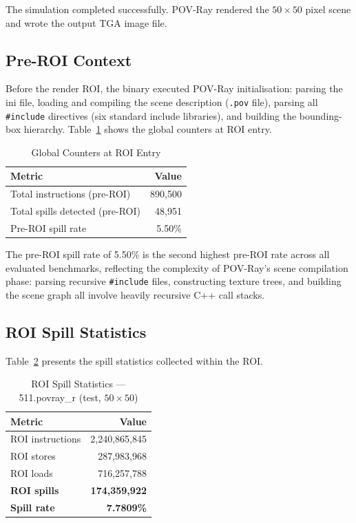 \documentclass[conference]{IEEEtran}
\begin{document}
The simulation completed successfully. POV-Ray rendered the
$50\times50$ pixel scene and wrote the output TGA image file.

\subsection{Pre-ROI Context}

Before the render ROI, the binary executed POV-Ray initialisation:
parsing the ini file, loading and compiling the scene description
(\texttt{.pov} file), parsing all \texttt{\#include} directives
(six standard include libraries), and building the bounding-box
hierarchy. Table~\ref{tab:preroi} shows the global counters at
ROI entry.

\begin{table}[H]
\centering
\caption{Global Counters at ROI Entry}
\label{tab:preroi}
\begin{tabular}{lr}
\toprule
\textbf{Metric} & \textbf{Value} \\
\midrule
Total instructions (pre-ROI) & 890,500 \\
Total spills detected (pre-ROI) & 48,951 \\
Pre-ROI spill rate & 5.50\% \\
\bottomrule
\end{tabular}
\end{table}

The pre-ROI spill rate of 5.50\% is the second highest pre-ROI rate
across all evaluated benchmarks, reflecting the complexity of
POV-Ray's scene compilation phase: parsing recursive \texttt{\#include}
files, constructing texture trees, and building the scene graph all
involve heavily recursive C++ call stacks.

\subsection{ROI Spill Statistics}

Table~\ref{tab:roi} presents the spill statistics collected within
the ROI.

\begin{table}[H]
\centering
\caption{ROI Spill Statistics --- 511.povray\_r (test, $50\times50$)}
\label{tab:roi}
\begin{tabular}{lr}
\toprule
\textbf{Metric} & \textbf{Value} \\
\midrule
ROI instructions         & 2,240,865,845 \\
ROI stores               &   287,983,968 \\
ROI loads                &   716,257,788 \\
\midrule
\textbf{ROI spills}      & \textbf{174,359,922} \\
\textbf{Spill rate}      & \textbf{7.7809\%} \\
\bottomrule
\end{tabular}
\end{table}
\end{document}
